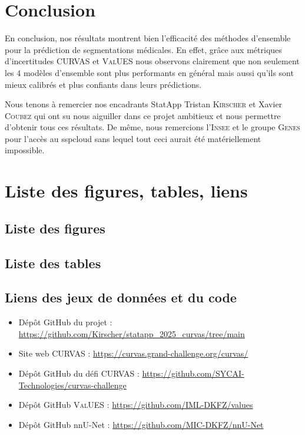 \documentclass[a4paper,french,bookmarks,12pt]{article}
\begin{document}
    \section{Conclusion}
    
    En conclusion, nos résultats montrent bien l'efficacité des méthodes d'ensemble pour la prédiction de segmentations médicales. En effet, grâce aux métriques d'incertitudes \textsc{CURVAS} et \textsc{ValUES} nous observons clairement que non seulement les 4 modèles d'ensemble sont plus performants en général mais aussi qu'ils sont mieux calibrés et plus confiants dans leurs prédictions. 
    
    Nous tenons à remercier nos encadrants StatApp Tristan \textsc{Kirscher} et Xavier \textsc{Coubez} qui ont su nous aiguiller dans ce projet ambitieux et nous permettre d'obtenir tous ces résultats. De même, nous remercions l'\textsc{Insee} et le groupe \textsc{Genes} pour l'accès au sspcloud sans lequel tout ceci aurait été matériellement impossible.

    \newpage
    \appendix
    
    \section{Liste des figures, tables, liens}
    
    \subsection*{Liste des figures}
    \makeatletter
    \renewcommand\listoffigures{%
    }
    \makeatother
    \listoffigures
    \subsection*{Liste des tables}
    \makeatletter
    \renewcommand\listoftables{%
    }
    \makeatother
    \listoftables
    
    \subsection*{Liens des jeux de données et du code}

    {\small
        \begin{itemize}
            \item Dépôt GitHub du projet : \url{https://github.com/Kirscher/statapp_2025_curvas/tree/main}
            \item Site web \textsc{CURVAS} : \url{https://curvas.grand-challenge.org/curvas/}
            \item Dépôt GitHub du défi \textsc{CURVAS} : \url{https://github.com/SYCAI-Technologies/curvas-challenge}
            \item Dépôt GitHub \textsc{ValUES} : \url{https://github.com/IML-DKFZ/values}
            \item Dépôt GitHub nnU-Net : \url{https://github.com/MIC-DKFZ/nnU-Net}
        \end{itemize}
    }
    
\end{document}
